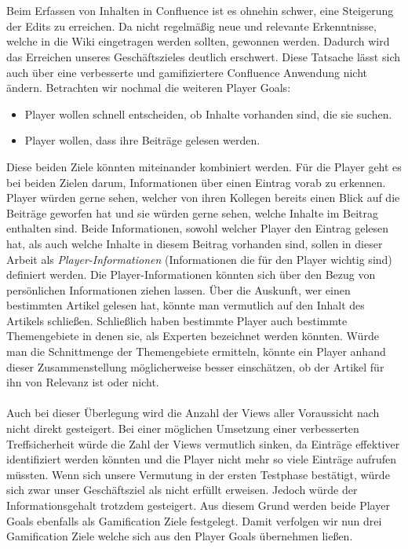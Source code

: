 \documentclass[a4paper,12pt,twoside]{scrartcl}
\begin{document}
\\\\
Beim Erfassen von Inhalten in Confluence ist es ohnehin schwer, eine Steigerung der Edits zu erreichen. Da nicht regelmäßig neue und relevante Erkenntnisse, welche in die Wiki eingetragen werden sollten, gewonnen werden. Dadurch wird das Erreichen unseres Geschäftszieles deutlich erschwert. Diese Tatsache lässt sich auch über eine verbesserte und gamifiziertere Confluence Anwendung nicht ändern. Betrachten wir nochmal die weiteren Player Goals:
\begin{itemize} 
      \item Player wollen schnell entscheiden, ob Inhalte vorhanden sind, die sie suchen.
      \item Player wollen, dass ihre Beiträge gelesen werden.
\end{itemize}    
Diese beiden Ziele könnten miteinander kombiniert werden. Für die Player geht es bei beiden Zielen darum, Informationen über einen Eintrag vorab zu erkennen. Player würden gerne sehen, welcher von ihren Kollegen bereits einen Blick auf die Beiträge geworfen hat und sie würden gerne sehen, welche Inhalte im Beitrag enthalten sind. Beide Informationen, sowohl welcher Player den Eintrag gelesen hat, als auch welche Inhalte in diesem Beitrag vorhanden sind, sollen in dieser Arbeit als \textit{Player-Informationen} (Informationen die für den Player wichtig sind) definiert werden. Die Player-Informationen könnten sich über den Bezug von persönlichen Informationen ziehen lassen. Über die Auskunft, wer einen bestimmten Artikel gelesen hat, könnte man vermutlich auf den Inhalt des Artikels schließen. Schließlich haben bestimmte Player auch bestimmte Themengebiete in denen sie, als Experten bezeichnet werden könnten. Würde man die Schnittmenge der Themengebiete ermitteln, könnte ein Player anhand dieser Zusammenstellung möglicherweise besser einschätzen, ob der Artikel für ihn von Relevanz ist oder nicht.
\\\\
Auch bei dieser Überlegung wird die Anzahl der Views aller Voraussicht nach nicht direkt gesteigert. Bei einer möglichen Umsetzung einer verbesserten Treffsicherheit würde die Zahl der Views vermutlich sinken, da Einträge effektiver identifiziert werden könnten und die Player nicht mehr so viele Einträge aufrufen müssten. Wenn sich unsere Vermutung in der ersten Testphase bestätigt, würde sich zwar unser Geschäftsziel als nicht erfüllt erweisen. Jedoch würde der Informationsgehalt trotzdem gesteigert. Aus diesem Grund werden beide Player Goals ebenfalls als Gamification Ziele festgelegt. Damit verfolgen wir nun drei Gamification Ziele welche sich aus den Player Goals übernehmen ließen.   
\end{document}
